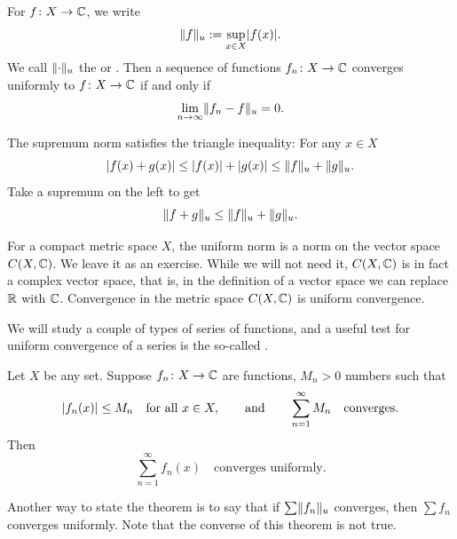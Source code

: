 For $f \colon X \to {\mathbb{C}}$, we write
\begin{equation*}
\lVert {f} \rVert_u := \sup_{x \in X} \lvert {f(x)} \rvert .
\end{equation*}
We call $\lVert {\cdot} \rVert_u$
the \emph{} or \emph{}.
Then a sequence of functions
$f_n \colon X \to {\mathbb{C}}$ converges uniformly to $f \colon X \to {\mathbb{C}}$ if and only if
\begin{equation*}
\lim_{n\to \infty} \lVert {f_n-f} \rVert_u = 0 .
\end{equation*}

The supremum norm satisfies the triangle inequality: For any $x \in X$
\begin{equation*}
\lvert {f(x)+g(x)} \rvert \leq
\lvert {f(x)} \rvert+\lvert {g(x)} \rvert \leq
\lVert {f} \rVert_u+\lVert {g} \rVert_u .
\end{equation*}
Take a supremum on the left to get
\begin{equation*}
\lVert {f+g} \rVert_u \leq
\lVert {f} \rVert_u+\lVert {g} \rVert_u .
\end{equation*}

For a compact metric space $X$,
the uniform norm is a norm on the vector space $C(X,{\mathbb{C}})$.
We leave it as an exercise.
While we will not need it, $C(X,{\mathbb{C}})$ is in fact a complex
vector space, that is, in the definition of a vector space we can replace
${\mathbb{R}}$ with ${\mathbb{C}}$.
Convergence in the metric space $C(X,{\mathbb{C}})$ is
uniform convergence.

We will study a couple of types of series of functions, and
a useful test for uniform convergence of a series is the 
so-called \emph{}.

\begin{thm} \label{thm:weiermtest}
Let $X$ be any set.
Suppose $f_n \colon X \to {\mathbb{C}}$ are functions, $M_n > 0$ numbers such
that
\begin{equation*}
\lvert {f_n(x)} \rvert\leq M_n \quad \text{for all } x \in X,
\qquad \text{and} \qquad
\sum_{n=1}^\infty M_n
\quad \text{converges}.
\end{equation*}
Then
\begin{equation*}
\sum_{n=1}^\infty f_n(x)
\quad \text{converges uniformly}.
\end{equation*}
\end{thm}

Another way to state the theorem is to say that if
$\sum \lVert {f_n} \rVert_u$ converges, then $\sum f_n$ converges uniformly.
Note that the converse of this theorem is not true.

